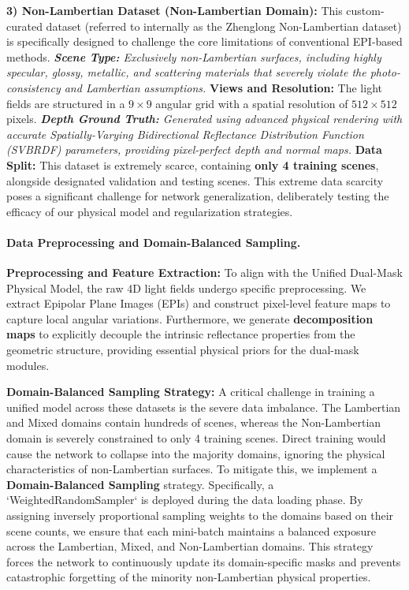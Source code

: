 \textbf{3) Non-Lambertian Dataset (Non-Lambertian Domain):} 
This custom-curated dataset (referred to internally as the Zhenglong Non-Lambertian dataset) is specifically designed to challenge the core limitations of conventional EPI-based methods. 
\textit{ \textbf{Scene Type:} Exclusively non-Lambertian surfaces, including highly specular, glossy, metallic, and scattering materials that severely violate the photo-consistency and Lambertian assumptions.
} \textbf{Views and Resolution:} The light fields are structured in a $9 \times 9$ angular grid with a spatial resolution of $512 \times 512$ pixels.
\textit{ \textbf{Depth Ground Truth:} Generated using advanced physical rendering with accurate Spatially-Varying Bidirectional Reflectance Distribution Function (SVBRDF) parameters, providing pixel-perfect depth and normal maps.
} \textbf{Data Split:} This dataset is extremely scarce, containing \textbf{only 4 training scenes}, alongside designated validation and testing scenes. This extreme data scarcity poses a significant challenge for network generalization, deliberately testing the efficacy of our physical model and regularization strategies.

\paragraph{Data Preprocessing and Domain-Balanced Sampling.}

\textbf{Preprocessing and Feature Extraction:} 
To align with the Unified Dual-Mask Physical Model, the raw 4D light fields undergo specific preprocessing. We extract Epipolar Plane Images (EPIs) and construct pixel-level feature maps to capture local angular variations. Furthermore, we generate \textbf{decomposition maps} to explicitly decouple the intrinsic reflectance properties from the geometric structure, providing essential physical priors for the dual-mask modules.

\textbf{Domain-Balanced Sampling Strategy:} 
A critical challenge in training a unified model across these datasets is the severe data imbalance. The Lambertian and Mixed domains contain hundreds of scenes, whereas the Non-Lambertian domain is severely constrained to only 4 training scenes. Direct training would cause the network to collapse into the majority domains, ignoring the physical characteristics of non-Lambertian surfaces. To mitigate this, we implement a \textbf{Domain-Balanced Sampling} strategy. Specifically, a `WeightedRandomSampler` is deployed during the data loading phase. By assigning inversely proportional sampling weights to the domains based on their scene counts, we ensure that each mini-batch maintains a balanced exposure across the Lambertian, Mixed, and Non-Lambertian domains. This strategy forces the network to continuously update its domain-specific masks and prevents catastrophic forgetting of the minority non-Lambertian physical properties.

